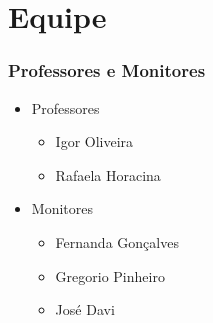 \section{Equipe}


\begin{frame}
    \frametitle{Professores e Monitores}
    
    \begin{itemize}
        \item Professores
        \begin{itemize}
            \item Igor Oliveira
            \item Rafaela Horacina
        \end{itemize}

        \item Monitores
        \begin{itemize}
            \item Fernanda Gonçalves
            \item Gregorio Pinheiro
            \item José Davi
        \end{itemize}
    \end{itemize}
\end{frame}
